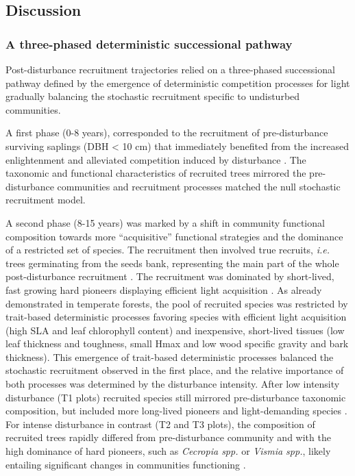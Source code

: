 \documentclass[
  11pt,
  french,
  A4paper,
  extrafontsizes,onecolumn,openright
  ]{memoir}
\begin{document}
\subsection{Discussion}\label{discussion-2}

\subsubsection{A three-phased deterministic successional
pathway}\label{a-three-phased-deterministic-successional-pathway}

Post-disturbance recruitment trajectories relied on a three-phased
successional pathway defined by the emergence of deterministic
competition processes for light gradually balancing the stochastic
recruitment specific to undisturbed communities.

A first phase (0-8 years), corresponded to the recruitment of
pre-disturbance surviving saplings (DBH \textless{} 10 cm) that
immediately benefited from the increased enlightenment and alleviated
competition induced by disturbance \autocites{Denslow2000}{Herault2010}.
The taxonomic and functional characteristics of recruited trees mirrored
the pre-disturbance communities and recruitment processes matched the
null stochastic recruitment model.

A second phase (8-15 years) was marked by a shift in community
functional composition towards more ``acquisitive'' functional
strategies and the dominance of a restricted set of species. The
recruitment then involved true recruits, \emph{i.e.} trees germinating
from the seeds bank, representing the main part of the whole
post-disturbance recruitment \autocite{Lawton1988}. The recruitment was
dominated by short-lived, fast growing hard pioneers displaying
efficient light acquisition
\autocites{Wright2004}{Chave2009}{Herault2011}. As already demonstrated
in temperate forests, the pool of recruited species was restricted by
trait-based deterministic processes favoring species with efficient
light acquisition (high SLA and leaf chlorophyll content) and
inexpensive, short-lived tissues (low leaf thickness and toughness,
small Hmax and low wood specific gravity and bark
thickness)\autocites{Chave2004}{Kunstler2016}. This emergence of
trait-based deterministic processes balanced the stochastic recruitment
observed in the first place, and the relative importance of both
processes was determined by the disturbance intensity. After low
intensity disturbance (T1 plots) recruited species still mirrored
pre-disturbance taxonomic composition, but included more long-lived
pioneers and light-demanding species \autocite{Bongers2009}. For intense
disturbance in contrast (T2 and T3 plots), the composition of recruited
trees rapidly differed from pre-disturbance community and with the high
dominance of hard pioneers, such as \emph{Cecropia spp.} or \emph{Vismia
spp.}, likely entailing significant changes in communities functioning
\autocite{Diaz2005}.
\end{document}
